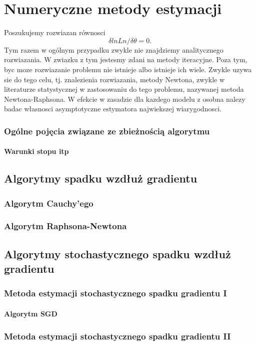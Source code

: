 \chapter{Numeryczne metody estymacji}
Poszukujemy rozwiazan równosci
$$ \delta ln Ln  / \delta \theta =  0.$$
Tym razem w ogólnym przypadku zwykle nie znajdziemy analitycznego rozwiazania. W
zwiazku z tym jestesmy zdani na metody iteracyjne. Poza tym, byc moze rozwiazanie problemu
nie istnieje albo istnieje ich wiele. Zwykle uzywa sie do tego celu, tj. znalezienia
rozwiazania, metody Newtona, zwykle w literaturze statystycznej w zastosowaniu do tego
problemu, nazywanej metoda Newtona-Raphsona. W efekcie w zasadzie dla kazdego modelu
z osobna nalezy badac własnosci asymptotyczne estymatora najwiekszej wiarygodnosci.
\subsection{Ogólne pojęcia związane ze zbieżnością algorytmu}
\subsubsection{Warunki stopu itp}
\section{Algorytmy spadku wzdłuż gradientu}
\subsection{Algorytm Cauchy'ego}
\subsection{Algorytm Raphsona-Newtona}
\section{Algorytmy stochastycznego spadku wzdłuż gradientu}\label{SGD}
\subsection{Metoda estymacji stochastycznego spadku gradientu I}
\subsubsection{Algorytm SGD}
\subsection{Metoda estymacji stochastycznego spadku gradientu II}
